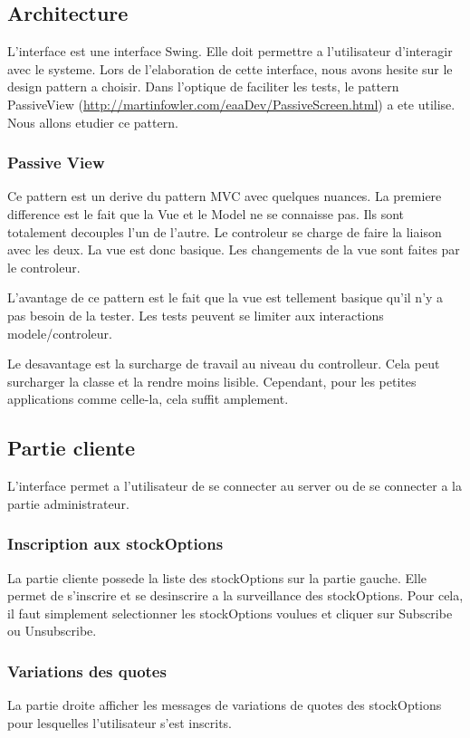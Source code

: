 \subsection{Architecture}
L'interface est une interface Swing. Elle doit permettre a l'utilisateur d'interagir avec le systeme. Lors de l'elaboration de cette interface, nous avons hesite sur le design pattern a choisir. Dans l'optique de faciliter les tests, le pattern PassiveView (\url{http://martinfowler.com/eaaDev/PassiveScreen.html}) a ete utilise. Nous allons etudier ce pattern.
\subsubsection{Passive View}
Ce pattern est un derive du pattern MVC avec quelques nuances. La premiere difference est le fait que la Vue et le Model ne se connaisse pas. Ils sont totalement decouples l'un de l'autre. Le controleur se charge de faire la liaison avec les deux. La vue est donc basique. Les changements de la vue sont faites par le controleur.

L'avantage de ce pattern est le fait que la vue est tellement basique qu'il n'y a pas besoin de la tester. Les tests peuvent se limiter aux interactions modele/controleur.

Le desavantage est la surcharge de travail au niveau du controlleur. Cela peut surcharger la classe et la rendre moins lisible. Cependant, pour les petites applications comme celle-la, cela suffit amplement.
\subsection{Partie cliente}
L'interface permet a l'utilisateur de se connecter au server ou de se connecter a la partie administrateur.
\subsubsection{Inscription aux stockOptions}
La partie cliente possede la liste des stockOptions sur la partie gauche. Elle permet de s'inscrire et se desinscrire a la surveillance des stockOptions. Pour cela, il faut simplement selectionner les stockOptions voulues et cliquer sur Subscribe ou Unsubscribe.
\subsubsection{Variations des quotes}
La partie droite afficher les messages de variations de quotes des stockOptions pour lesquelles l'utilisateur s'est inscrits.
